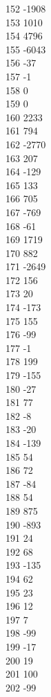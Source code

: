 { 152	-1908 \\
 153	1010 \\
 154	4796 \\
 155	-6043 \\
 156	-37 \\
 157	-1 \\
 158	0 \\
 159	0 \\
 160	2233 \\
 161	794 \\
 162	-2770 \\
 163	207 \\
 164	-129 \\
 165	133 \\
 166	705 \\
 167	-769 \\
 168	-61 \\
 169	1719 \\
 170	882 \\
 171	-2649 \\
 172	156 \\
 173	20 \\
 174	-173 \\
 175	155 \\
 176	-99 \\
 177	-1 \\
 178	199 \\
 179	-155 \\
 180	-27 \\
 181	77 \\
 182	-8 \\
 183	-20 \\
 184	-139 \\
 185	54 \\
 186	72 \\
 187	-84 \\
 188	54 \\
 189	875 \\
 190	-893 \\
 191	24 \\
 192	68 \\
 193	-135 \\
 194	62 \\
 195	23 \\
 196	12 \\
 197	7 \\
 198	-99 \\
 199	-17 \\
 200	19 \\
 201	100 \\
 202	-99 \\
}
